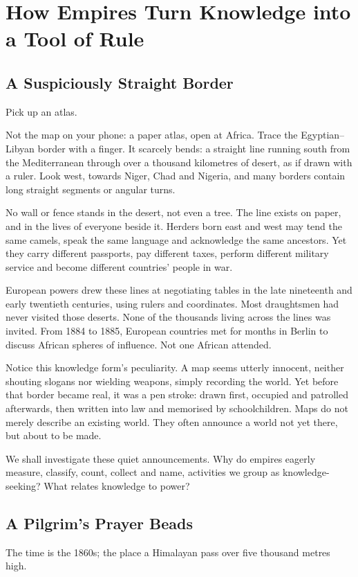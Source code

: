 \chapter[Knowledge and Empire]{How Empires Turn Knowledge into a Tool of Rule}
\section{A Suspiciously Straight Border}
Pick up an atlas.

Not the map on your phone: a paper atlas, open at Africa. Trace the Egyptian--Libyan border with a finger. It scarcely bends: a straight line running south from the Mediterranean through over a thousand kilometres of desert, as if drawn with a ruler. Look west, towards Niger, Chad and Nigeria, and many borders contain long straight segments or angular turns.

No wall or fence stands in the desert, not even a tree. The line exists on paper, and in the lives of everyone beside it. Herders born east and west may tend the same camels, speak the same language and acknowledge the same ancestors. Yet they carry different passports, pay different taxes, perform different military service and become different countries' people in war.

European powers drew these lines at negotiating tables in the late nineteenth and early twentieth centuries, using rulers and coordinates. Most draughtsmen had never visited those deserts. None of the thousands living across the lines was invited. From 1884 to 1885, European countries met for months in Berlin to discuss African spheres of influence. Not one African attended.

Notice this knowledge form's peculiarity. A map seems utterly innocent, neither shouting slogans nor wielding weapons, simply recording the world. Yet before that border became real, it was a pen stroke: drawn first, occupied and patrolled afterwards, then written into law and memorised by schoolchildren. Maps do not merely describe an existing world. They often announce a world not yet there, but about to be made.

We shall investigate these quiet announcements. Why do empires eagerly measure, classify, count, collect and name, activities we group as knowledge-seeking? What relates knowledge to power?

\section{A Pilgrim's Prayer Beads}
The time is the 1860s; the place a Himalayan pass over five thousand metres high.

